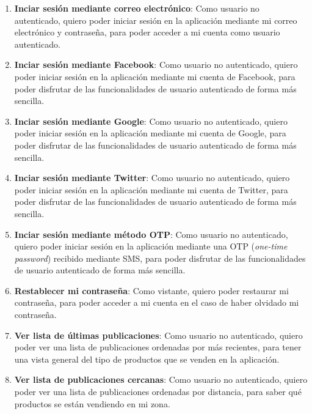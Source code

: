 \begin{enumerate}[label=HU-\protect\twodigits{\arabic*}:, align=left, leftmargin=*]
\item \textbf{Inciar sesión mediante correo electrónico}: Como usuario no autenticado, quiero poder iniciar sesión en la aplicación mediante mi correo electrónico y contraseña, para poder acceder a mi cuenta como usuario autenticado.

\item \textbf{Inciar sesión mediante Facebook}: Como usuario no autenticado, quiero poder iniciar sesión en la aplicación mediante mi cuenta de Facebook, para poder disfrutar de las funcionalidades de usuario autenticado de forma más sencilla.

\item \textbf{Inciar sesión mediante Google}: Como usuario no autenticado, quiero poder iniciar sesión en la aplicación mediante mi cuenta de Google, para poder disfrutar de las funcionalidades de usuario autenticado de forma más sencilla.

\item \textbf{Inciar sesión mediante Twitter}: Como usuario no autenticado, quiero poder iniciar sesión en la aplicación mediante mi cuenta de Twitter, para poder disfrutar de las funcionalidades de usuario autenticado de forma más sencilla.

\item \textbf{Inciar sesión mediante método OTP}: Como usuario no autenticado, quiero poder iniciar sesión en la aplicación mediante una OTP (\textit{one-time password}) recibido mediante SMS, para poder disfrutar de las funcionalidades de usuario autenticado de forma más sencilla.

\item \textbf{Restablecer mi contraseña}: Como vistante, quiero poder restaurar mi contraseña, para poder acceder a mi cuenta en el caso de haber olvidado mi contraseña.

\item \textbf{Ver lista de últimas publicaciones}: Como usuario no autenticado, quiero poder ver una lista de publicaciones ordenadas por más recientes, para tener una vista general del tipo de productos que se venden en la aplicación.

\item \textbf{Ver lista de publicaciones cercanas}: Como usuario no autenticado, quiero poder ver una lista de publicaciones ordenadas por distancia, para saber qué productos se están vendiendo en mi zona.


\end{enumerate}
